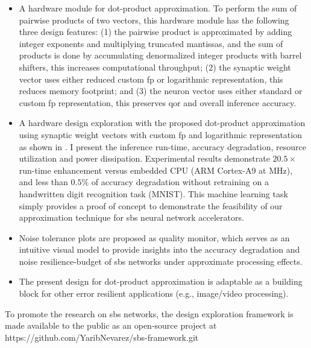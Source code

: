 \begin{itemize}
	\item A hardware module for dot-product approximation. To perform the sum of pairwise products of two vectors, this hardware module has the following three design features: (1) the pairwise product is approximated by adding integer exponents and multiplying truncated mantissas, and the sum of products is done by accumulating denormalized integer products with barrel shifters, this increases computational throughput; (2) the synaptic weight vector uses either reduced custom \gls{fp} or logarithmic representation, this reduces memory footprint; and (3) the neuron vector uses either standard or custom \gls{fp} representation, this preserves \gls{qor} and overall inference accuracy.
	\item A hardware design exploration with the proposed dot-product approximation using synaptic weight vectors with custom \gls{fp} and logarithmic representation as shown in . I present the inference run-time, accuracy degradation, resource utilization and power dissipation. Experimental results demonstrate $20.5\times$ run-time enhancement versus embedded CPU (ARM Cortex-A9 at \unit[666]{MHz}), and less than $0.5\%$ of accuracy degradation without retraining on a handwritten digit recognition task (MNIST). This machine learning task simply provides a proof of concept to demonstrate the feasibility of our approximation technique for \gls{sbs} neural network accelerators.
	\item Noise tolerance plots are proposed as quality monitor, which serves as an intuitive visual model to provide insights into the accuracy degradation and noise resilience-budget of \gls{sbs} networks under approximate processing effects.
	\item The present design for dot-product approximation is adaptable as a building block for other error resilient applications (e.g., image/video processing).
\end{itemize}

To promote the research on \gls{sbs} networks, the design exploration framework is made available to the public as an open-source project at https://github.com/YaribNevarez/sbs-framework.git

